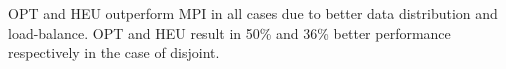 OPT and HEU outperform MPI in all cases due to better data distribution and load-balance. OPT and HEU result in 50\% and 36\% better performance respectively in the case of disjoint. 
\begin{comment}
\begin{table*}%
   \centering
    \begin{tabular}{| p{0.75cm} | p{0.3cm} | p{0.3cm} | p{0.3cm} | p{0.3cm} | p{0.3cm} | p{0.3cm} | p{0.3cm} | p{0.3cm} | p{0.3cm} | p{0.3cm} | p{0.3cm} | p{0.3cm} | p{0.3cm} | p{0.3cm} |p{0.3cm} | p{0.3cm} |p{0.3cm} | p{0.3cm} |p{0.3cm} | p{0.3cm} | p{0.3cm} | p{0.5cm} |p{0.3cm} |}
    \hline
     Configs & \multicolumn{4}{ c | }{Config 1} & \multicolumn{4}{ c| }{Config 2} & \multicolumn{4}{ c| }{Config 3} & \multicolumn{4}{ c| } {Config 4} & \multicolumn{4}{ c| }{Config 5} & \multicolumn{3}{ c| }{Average}\\ \hline
     Patterns & OPT & HEU & MPI & Dist & OPT & HEU & MPI & Dist & OPT & HEU & MPI & Dist & OPT & HEU & MPI & Dist & OPT & HEU & MPI & Dist & OPT & HEU & MPI \\ \hline
     Disjoint & 83  & 71 & 50 & 8.41 & 81 & 75  & 54 & 8.35 & 85  & 77 &  55 & 8.32 & 89  & 88 &  62 & 8.50 &  84 & 71 & 59 & 8.45 & 84.4 & 76.4 & 56.0 \\ \hline
     Overlap  & 89  & 72 & 52 & 6.54 & 86 & 67  & 60 & 6.53 & 94 & 71 &  64 & 6.55 & 98 & 68 &  57 & 6.50 & 88 & 78 & 59 & 6.43 & 91.0  & 71.2 & 58.4 \\ \hline
     Subset   & 92  & 72 & 55 & 6.40 & 91 & 68  & 60 & 6.26 & 89  & 63 &  52 & 6.27 & 94  & 80 & 51 & 6.33 & 96  & 68 & 57 & 6.39 & 92.4 & 70.2 & 55.0 \\ \hline
    \end{tabular}
    \caption{Throughput (GB/s) for MPI\_Alltoallv (MPI), Optimization (Opt), Heuristic (Heu) and average number of hops (Dist) between sources and destinations for 5 different random pairings (Config) of sources and destinations in 1024-node partition.}
    \label{table:random_1024}
\end{table*}
\end{comment}
